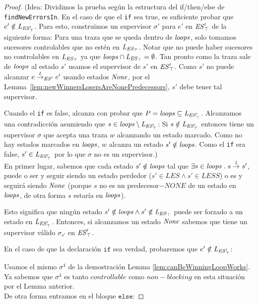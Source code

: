 \begin{proof}
	(Idea: Dividimos la prueba según la estructura del  if/then/else de \texttt{findNewErrorsIn}. 
	En el caso de que el \texttt{if} sea true, es suficiente probar que $e' \notin \mathit{L_{\mathit{\mathit{ES}'_{\top}}}}$. Para esto, 
	construimos un supervisor $\sigma'$ para $e'$ en $\mathit{\mathit{ES}'_{\top}}$ de la siguiente forma: Para una traza que se queda dentro de $\mathit{loops}$, solo tomamos sucesores controlables que no estén en $\mathit{L_{\mathit{\mathit{ES}_{\top}}}}$. Notar que no puede haber sucesores no controlables en $\mathit{L_{\mathit{\mathit{ES}_{\top}}}}$ ya que
	$\mathit{loops} \cap \mathit{L_{\mathit{\mathit{ES}_{\top}}}}= \emptyset$. Tan pronto como la traza sale de $\mathit{loops}$ al estado $s'$ usamos el supervisor de $s'$ en $\mathit{\mathit{ES}'_{\top}}$. 
	Como $s'$ no puede alcanzar $e \overset{\ell}{\rightarrow}_{\mathit{ES}'} 
	e'$ usando estados $\mathit{None}$, por el 
	Lemma~\ref{lem:newWinnersLosersAreNonePredecessors}, $s'$ debe tener tal supervisor. 
	
	Cuando el \texttt{if} es false, alcanza con probar que $P = \mathit{loops} \subseteq \mathit{L_{\mathit{\mathit{ES}'_{\top}}}}$. Alcanzamos una contradicción asumiendo que $s \in \mathit{loops} \setminus \mathit{L_{\mathit{\mathit{ES}'_{\top}}}}$: Si $s 
	\notin \mathit{L_{\mathit{\mathit{ES}'_{\top}}}}$ entonces tiene un supervisor $\sigma$ que acepta una traza $w$ alcanzando un estado marcado. Como no hay estados marcados en $\mathit{loops}$, $w$ alcanza un estado $s' \notin \mathit{loops}$. Como el
	\texttt{if} era false, $s' \in \mathit{L_{\mathit{\mathit{ES}'_{\top}}}}$ por lo que $\sigma$ no es un supervisor.)\\
	


En primer lugar, sabemos que cada estado $s' \notin \mathit{loops}$ tal que $\exists s \in \mathit{loops} \;.\; s 
\overset{l}{\rightarrow}_{} s'$, puede o ser y seguir siendo un estado perdedor ($s' \in LES \wedge s' \in LESS$) o es y seguirá siendo $\mathit{None}$ (porque $s$ no es un predecesor$-NONE$ de un estado en $\mathit{loops}$, de otra forma $s$ estaría en $\mathit{loops}$). 

Esto significa que ningún estado $s' \notin \mathit{loops} \wedge s' \notin \mathit{L_{\mathit{\mathit{ES}_{\top}}}}$ puede ser forzado a un estado en $\mathit{L_{\mathit{\mathit{ES}'_{\top}}}}$. Entonces, si alcanzamos un estado $\mathit{None}$ sabemos que tiene un supervisor válido $\sigma_{s'}$ en $\mathit{\mathit{ES}'_{\top}}$.

En el caso de que la declaración $\texttt{if}$ sea verdad, probaremos que $e' \notin \mathit{L_{\mathit{\mathit{ES}'_{\top}}}}$:

Usamos el mismo $\sigma^4$ de la demostración Lemma \ref{lem:canBeWinningLoopWorks}. Ya sabemos que $\sigma^4$ es tanto $controllable$ como $non-blocking$ en esta situación por el Lemma anterior.\\

De otra forma entramos en el bloque $\texttt{else}$:


\end{proof}
